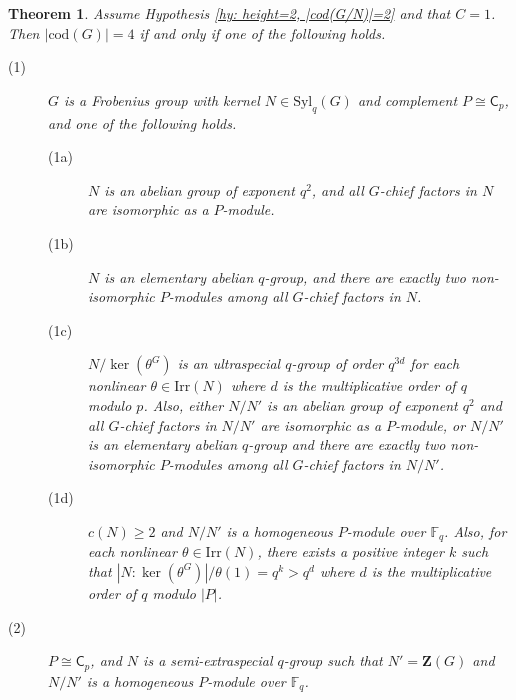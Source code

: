 \documentclass[9pt]{article}
\newtheorem{thm}[lem]{\bf Theorem}
\begin{document}
\begin{thm}\label{thm: height=2, |cod(G/N)|=2, classification}
	Assume Hypothesis \ref{hy: height=2, |cod(G/N)|=2} and that $C=1$.
	Then $|\mathrm{cod}(G)|=4$ if and only if one of the following holds.
	\begin{description}
		\item[(1)] $G$ is a Frobenius group with kernel $N \in \mathrm{Syl}_{q}(G)$ and complement $P\cong\mathsf{C}_{p}$, 
		 and one of the following holds.
		\begin{description}
			\item[(1a)] $N$ is an abelian group of exponent $q^{2}$, and all $G$-chief factors in $N$ are isomorphic as a $P$-module.
			\item[(1b)] $N$ is an elementary abelian $q$-group, and there are exactly two non-isomorphic $P$-modules among all $G$-chief factors in $N$. 
			\item[(1c)] $N/\ker(\theta^{G})$ is an ultraspecial $q$-group of order $q^{3d}$ for each nonlinear $\theta\in \mathrm{Irr}(N)$ where $d$ is the multiplicative order of $q$ modulo $p$. 
			Also, either $N/N'$
			is an abelian group of exponent $q^{2}$ and all $G$-chief factors in $N/N'$ are isomorphic as a $P$-module,
            or $N/N'$ is an elementary abelian $q$-group and there are exactly two non-isomorphic $P$-modules among all $G$-chief factors in $N/N'$.
			\item[(1d)] $c(N)\geq 2$ and $N/N'$ is a homogeneous $P$-module over $\mathbb{F}_q$. Also, for each nonlinear $\theta\in \mathrm{Irr}(N)$, 
			there exists a positive integer $k$ such that
			$|N:\ker(\theta^G)|/\theta(1)=q^{k}>q^{d}$ where $d$ is the multiplicative order of $q$ modulo $|P|$.
		\end{description}
		\item[(2)] $P\cong \mathsf{C}_{p}$, and $N$ is a semi-extraspecial $q$-group such that $N'=\mathbf{Z}(G)$ and $N/N'$ is a homogeneous $P$-module over $\mathbb{F}_q$.
	\end{description}
\end{thm}
\end{document}
